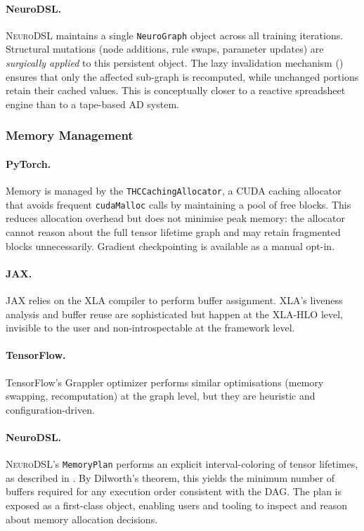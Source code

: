 \documentclass{article}
\begin{document}
\paragraph{NeuroDSL.} \textsc{NeuroDSL} maintains a single \texttt{NeuroGraph} object across all training iterations. Structural mutations (node additions, rule swaps, parameter updates) are \emph{surgically applied} to this persistent object. The lazy invalidation mechanism () ensures that only the affected sub-graph is recomputed, while unchanged portions retain their cached values. This is conceptually closer to a reactive spreadsheet engine than to a tape-based AD system.

\subsubsection{Memory Management}
\paragraph{PyTorch.} Memory is managed by the \texttt{THCCachingAllocator}, a CUDA caching allocator that avoids frequent \texttt{cudaMalloc} calls by maintaining a pool of free blocks. This reduces allocation overhead but does not minimise peak memory: the allocator cannot reason about the full tensor lifetime graph and may retain fragmented blocks unnecessarily. Gradient checkpointing \cite{checkpointing} is available as a manual opt-in.

\paragraph{JAX.} JAX relies on the XLA compiler to perform buffer assignment. XLA's liveness analysis and buffer reuse are sophisticated but happen at the XLA-HLO level, invisible to the user and non-introspectable at the framework level.

\paragraph{TensorFlow.} TensorFlow's Grappler optimizer performs similar optimisations (memory swapping, recomputation) at the graph level, but they are heuristic and configuration-driven.

\paragraph{NeuroDSL.} \textsc{NeuroDSL}'s \texttt{MemoryPlan} performs an explicit interval-coloring of tensor lifetimes, as described in . By Dilworth's theorem, this yields the minimum number of buffers required for any execution order consistent with the DAG. The plan is exposed as a first-class object, enabling users and tooling to inspect and reason about memory allocation decisions.
\end{document}
